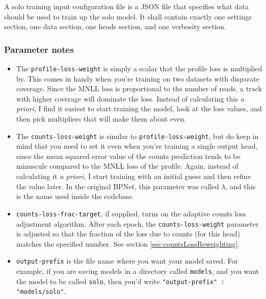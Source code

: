 \documentclass{article}
\begin{document}
A solo training input configuration file is a JSON file that specifies what data
should be used to train up the solo model.
It shall contain exactly one settings section, one data section, one heads
section, and one verbosity section.



\subsubsection{Parameter notes}

\begin{itemize}
    \item The \texttt{profile-loss-weight} is simply a scalar that the profile
        loss is multiplied by.
        This comes in handy when you're training on two datasets with disparate
        coverage.
        Since the MNLL loss is proportional to the number of reads, a track with
        higher coverage will dominate the loss.
        Instead of calculating this \emph{a priori}, I find it easiest to start
        training the model, look at the loss values, and then pick multipliers
        that will make them about even.
    \item The \texttt{counts-loss-weight} is similar to
        \texttt{profile-loss-weight}, but do keep in mind that you need to set
        it even when you're training a single output head, since the mean
        squared error value of the counts prediction tends to be minuscule
        compared to the MNLL loss of the profile.
        Again, instead of calculating it \emph{a priori}, I start training with
        an initial guess and then refine the value later.
        In the original BPNet, this parameter was called $\lambda$, and this is
        the name used inside the codebase.
    \item \texttt{counts-loss-frac-target}, if supplied, turns on the adaptive
        counts loss adjustment algorithm.
        After each epoch, the \texttt{counts-loss-weight} parameter is adjusted
        so that the fraction of the loss due to counts (for this head) matches
        the specified number. See section \ref{sec:countsLossReweighting}.
    \item \begin{sloppypar}
        \texttt{output-prefix} is the file name where you want your model saved.
        For example, if you are saving models in a directory called
        \texttt{models}, and you want the model to be called \texttt{solo},
        then you'd write \verb|"output-prefix" : "models/solo"|.

\end{sloppypar}
\end{itemize}
\end{document}
